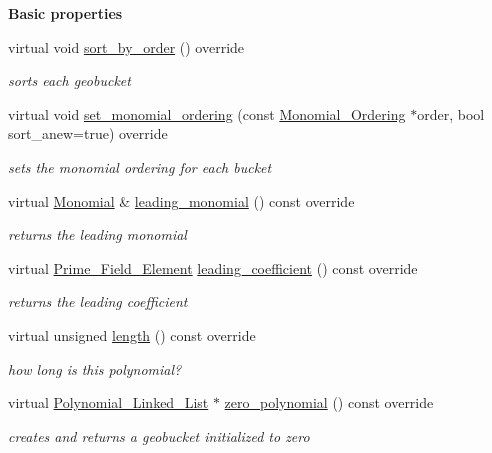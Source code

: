 \begin{Indent}\textbf{ Basic properties}\par
\begin{DoxyCompactItemize}
\item 
virtual void \hyperlink{group__polygroup_ad3c705cb5c03be2ed62fea65101d1195}{sort\+\_\+by\+\_\+order} () override
\begin{DoxyCompactList}\small\item\em sorts each geobucket \end{DoxyCompactList}\item 
virtual void \hyperlink{group__polygroup_ad3298b3201f53d0ddaa657206c140ca8}{set\+\_\+monomial\+\_\+ordering} (const \hyperlink{group__orderinggroup_class_monomial___ordering}{Monomial\+\_\+\+Ordering} $\ast$order, bool sort\+\_\+anew=true) override
\begin{DoxyCompactList}\small\item\em sets the monomial ordering for each bucket \end{DoxyCompactList}\item 
virtual \hyperlink{group__polygroup_class_monomial}{Monomial} \& \hyperlink{group__polygroup_aeb9d72c577af4de04e1e4cce04a9f41f}{leading\+\_\+monomial} () const override
\begin{DoxyCompactList}\small\item\em returns the leading monomial \end{DoxyCompactList}\item 
virtual \hyperlink{group___fields_group_class_prime___field___element}{Prime\+\_\+\+Field\+\_\+\+Element} \hyperlink{group__polygroup_a096aa08d1d7be3522c140908989e4dea}{leading\+\_\+coefficient} () const override
\begin{DoxyCompactList}\small\item\em returns the leading coefficient \end{DoxyCompactList}\item 
virtual unsigned \hyperlink{group__polygroup_a691f704d695210841a60fe2e6791d1af}{length} () const override
\begin{DoxyCompactList}\small\item\em how long is this polynomial? \end{DoxyCompactList}\item 
virtual \hyperlink{group__polygroup_class_polynomial___linked___list}{Polynomial\+\_\+\+Linked\+\_\+\+List} $\ast$ \hyperlink{group__polygroup_a7723d297ad268bb7139b1592f4e2eaff}{zero\+\_\+polynomial} () const override
\begin{DoxyCompactList}\small\item\em creates and returns a geobucket initialized to zero \end{DoxyCompactList}\item 

\end{DoxyCompactItemize}
\end{Indent}
